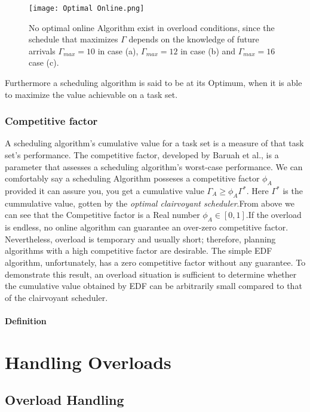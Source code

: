 \documentclass[conference]{IEEEtran}
\begin{document}
\begin{figure}[htp]
    \centering
    \texttt{[image: Optimal Online.png]}
    \caption{No optimal online Algorithm exist in overload conditions, since the schedule that maximizes $\Gamma$  depends  on  the knowledge  of  future  arrivals  $\Gamma_{max} = 10$  in case (a), $\Gamma_{max} = 12$ in case (b) and  $\Gamma_{max} = 16$ case (c).{ \cite{buttazzo2011hard}}}
    \label{fig:reg-gen}
\end{figure}

Furthermore a scheduling algorithm is said to be at its Optimum, when it is able to maximize the value achievable on a task set. 

\subsubsection{Competitive factor}
A scheduling algorithm's cumulative value for a task set is a measure of that task set's performance. The competitive factor, developed by Baruah et al., is a parameter that assesses a scheduling algorithm's worst-case performance.\cite{185354}
We can comfortably say a scheduling Algorithm posseses a competitive factor $\phi_A$ provided it can assure you, you get a cumulative value $\Gamma_A  \geq  \phi_A\Gamma^*$. Here $\Gamma^*$ is the cummulative value, gotten by the {\itshape optimal clairvoyant scheduler}.From above we can see that the Competitive factor is a Real number $\phi_A \in [0,1]$.If the overload is endless, no online algorithm can guarantee an over-zero competitive factor.
Nevertheless, overload is temporary and usually short; therefore, planning algorithms with a high competitive factor are desirable.
The simple EDF algorithm, unfortunately, has a zero competitive factor without any guarantee.
To demonstrate this result, an overload situation is sufficient to determine whether the cumulative value obtained by EDF can be arbitrarily small compared to that of the clairvoyant scheduler.

\paragraph{Definition}

\section{Handling Overloads}
\subsection{Overload Handling}
\end{document}
